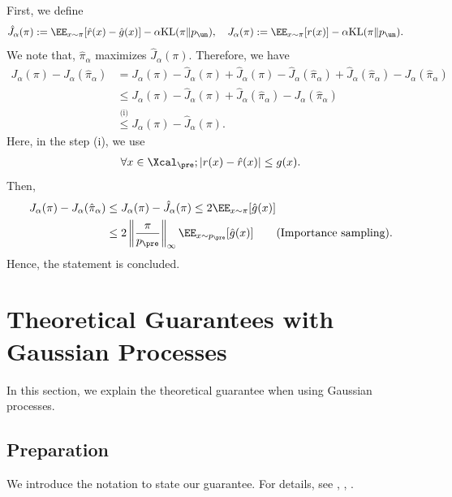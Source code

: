 First, we define 
\begin{align*}
    \hat J_{\alpha}(\pi) &:= \EE_{x \sim \pi}[ \hat r(x)-\hat g(x) ] -\alpha \mathrm{KL}(\pi \| p_{\un}),\quad J_{\alpha}(\pi):= \EE_{x \sim \pi}[ r(x)] -\alpha \mathrm{KL}(\pi \| p_{\un}). 
\end{align*}
We note that, $\hat{\pi}_\alpha$ maximizes $\hat{J}_\alpha(\pi)$. Therefore, we have 
\begin{align*}
       J_{\alpha}(\pi)- J_{\alpha}(\hat \pi_\alpha)&= J_{\alpha}(\pi)-  \hat J_{\alpha}(\pi)+ \hat J_{\alpha}(\pi)-  \hat J_{\alpha}(\hat \pi_\alpha)+    \hat J_{\alpha}(\hat \pi_\alpha)- J_{\alpha}(\hat \pi_\alpha)\\
    &\leq J_{\alpha}(\pi)-  \hat J_{\alpha}(\pi) +    \hat J_{\alpha}(\hat \pi_\alpha)- J_{\alpha}(\hat \pi_\alpha) \tag{Definition of $\hat \pi_\alpha$} \\
    &\stackrel{\text{(i)}}{\leq} J_{\alpha}(\pi)-  \hat J_{\alpha}(\pi). \tag{Pessimism}
\end{align*}
Here, in the step (i), we use 
\begin{align*}
  \forall x\in \Xcal_{\pre};  |r(x) - \hat r(x)| \le g(x). 
\end{align*}
Then, 
\begin{align*}
    J_{\alpha}(\pi)- J_{\alpha}(\hat \pi_\alpha)   & \leq J_\alpha(\pi) - \hat{J}_\alpha(\pi)  \leq 2\EE_{x\sim \pi} [\hat g(x)] \\
    & \leq 2 \left\|\frac{\pi}{p_{\pre} }\right\|_{\infty}\EE_{x\sim p_{\pre}}[\hat g(x)] \tag{Importance sampling}. 
\end{align*}
Hence, the statement is concluded. 






\section{Theoretical Guarantees with Gaussian Processes} \label{sec:GPs}

In this section, we explain the theoretical guarantee when using Gaussian processes.   

\subsection{Preparation}

We introduce the notation to state our guarantee. For details, see \citet[Appendix B]{srinivas2009gaussian}, \citet[Chapter 6.2]{uehara2021pessimistic}, \citet[Chapter C.3]{chang2021mitigating}. 

